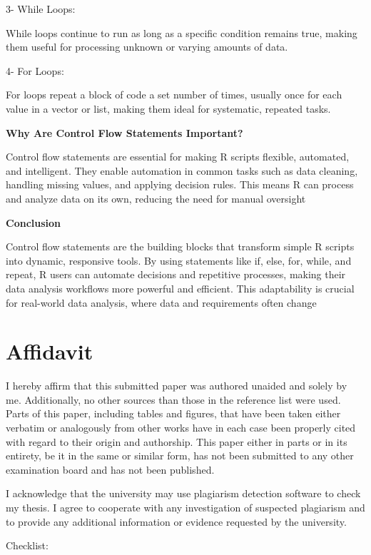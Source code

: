 \documentclass[
  man,
  floatsintext,
  longtable,
  nolmodern,
  notxfonts,
  notimes,
  colorlinks=true,linkcolor=blue,citecolor=blue,urlcolor=blue]{apa7}
\begin{document}
3- While Loops:

While loops continue to run as long as a specific condition remains
true, making them useful for processing unknown or varying amounts of
data.

4- For Loops:

For loops repeat a block of code a set number of times, usually once for
each value in a vector or list, making them ideal for systematic,
repeated tasks.

\textbf{Why Are Control Flow Statements Important?}

Control flow statements are essential for making R scripts flexible,
automated, and intelligent. They enable automation in common tasks such
as data cleaning, handling missing values, and applying decision rules.
This means R can process and analyze data on its own, reducing the need
for manual oversight

\textbf{Conclusion}

Control flow statements are the building blocks that transform simple R
scripts into dynamic, responsive tools. By using statements like if,
else, for, while, and repeat, R users can automate decisions and
repetitive processes, making their data analysis workflows more powerful
and efficient. This adaptability is crucial for real-world data
analysis, where data and requirements often change

\section{Affidavit}\label{affidavit}

I hereby affirm that this submitted paper was authored unaided and
solely by me. Additionally, no other sources than those in the reference
list were used. Parts of this paper, including tables and figures, that
have been taken either verbatim or analogously from other works have in
each case been properly cited with regard to their origin and
authorship. This paper either in parts or in its entirety, be it in the
same or similar form, has not been submitted to any other examination
board and has not been published.

I acknowledge that the university may use plagiarism detection software
to check my thesis. I agree to cooperate with any investigation of
suspected plagiarism and to provide any additional information or
evidence requested by the university.

Checklist:
\end{document}
